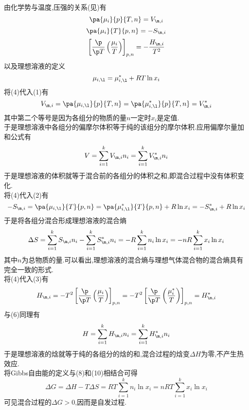 \documentclass{ctexart}
\begin{document}
\begin{derivation}\setcounter{equation}{0}
    由化学势与温度,压强的关系(见)有
    \begin{equation}\pa{\mu_i}{p}{T,n}=V_{\m,i}\end{equation}
    \begin{equation}\pa{\mu_i}{T}{p,n}=-S_{\m,i}\end{equation}
    \begin{equation}\left[\dfrac{\p}{\p T}\left(\dfrac{\mu_i}{T}\right)\right]_{p,n}=-\dfrac{H_{\m,i}}{T^2}\end{equation}
    以及理想溶液的定义
    \begin{equation}\mu_{i,\l}=\mu_{i,\l}^\ast+RT\ln x_i\end{equation}
    将(4)代入(1)有
    \begin{equation}
        V_{\m,i}=\pa{\mu_{i,\l}}{p}{T,n}=\pa{\mu_{i,\l}^\ast}{p}{T,n}=V_{\m,i}^\ast
    \end{equation}
    其中第二个等号是因为各组分的物质的量$n$一定时$x_i$是定值.\\
    于是理想溶液中各组分的偏摩尔体积等于纯的该组分的摩尔体积.应用偏摩尔量加和公式有
    \begin{equation}
        V=\sum_{i=1}^{k}V_{\m,i}n_i=\sum_{i=1}^{k}V_{\m,i}^\ast n_i
    \end{equation}
    于是理想溶液的体积就等于混合前的各组分的体积之和,即混合过程中没有体积变化.\\
    将(4)代入(2)有
    \begin{equation}
        -S_{\m,i}=\pa{\mu_{i,\l}}{T}{p,n}=\pa{\mu_{i,\l}^\ast}{T}{p,n}+R\ln x_i=-S_{\m,i}^\ast+R\ln x_i
    \end{equation}
    于是将各组分混合形成理想溶液的混合熵
    \begin{equation}
        \Delta S=\sum_{i=1}^{k}S_{\m,i}n_i-\sum_{i=1}^{k}S_{\m,i}^\ast n_i
        =-R\sum_{i=1}^{k}n_i\ln x_i=-nR\sum_{i=1}^{k}x_i\ln x_i
    \end{equation}
    其中$n$为总物质的量.可以看出,理想溶液的混合熵与理想气体混合物的混合熵具有完全一致的形式.\\
    将(4)代入(3)有
    \begin{equation}
        H_{\m,i}=-T^2\left[\dfrac{\p}{\p T}\left(\dfrac{\mu_i}{T}\right)\right]_{p,n}
        =-T^2\left[\dfrac{\p}{\p T}\left(\dfrac{\mu_i^\ast}{T}\right)\right]_{p,n}
        =H_{\m,i}^\ast
    \end{equation}
    与(6)同理有
    \begin{equation}
        H=\sum_{i=1}^{k}H_{\m,i}n_i=\sum_{i=1}^{k}H_{\m,i}^\ast n_i
    \end{equation}
    于是理想溶液的焓就等于纯的各组分的焓的和,混合过程的焓变$\Delta H$为零,不产生热效应.\\
    将Gibbs自由能的定义与(8)和(10)相结合可得
    \begin{equation}
        \Delta G=\Delta H-T\Delta S=RT\sum_{i=1}^{k}n_i\ln x_i=nRT\sum_{i=1}^{k}x_i\ln x_i
    \end{equation}
    可见混合过程的$\Delta G>0$,因而是自发过程.
\end{derivation}
\end{document}
